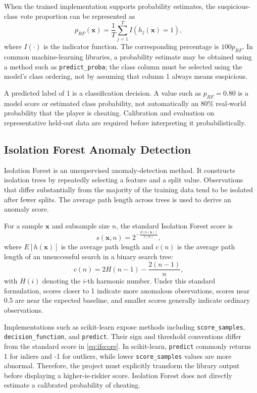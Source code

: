 \documentclass[conference]{IEEEtran}
\begin{document}
When the trained implementation supports probability estimates, the suspicious-class vote proportion can be represented as
\begin{equation}
p_{RF}(\mathbf{x})=\frac{1}{T}\sum_{j=1}^{T} I(h_j(\mathbf{x})=1),
\label{eq:rfprob}
\end{equation}
where $I(\cdot)$ is the indicator function. The corresponding percentage is $100p_{RF}$. In common machine-learning libraries, a probability estimate may be obtained using a method such as \texttt{predict\_proba}; the class column must be selected using the model's class ordering, not by assuming that column 1 always means suspicious.

A predicted label of 1 is a classification decision. A value such as $p_{RF}=0.80$ is a model score or estimated class probability, not automatically an 80\% real-world probability that the player is cheating. Calibration and evaluation on representative held-out data are required before interpreting it probabilistically.

\subsection{Isolation Forest Anomaly Detection}
Isolation Forest is an unsupervised anomaly-detection method. It constructs isolation trees by repeatedly selecting a feature and a split value. Observations that differ substantially from the majority of the training data tend to be isolated after fewer splits. The average path length across trees is used to derive an anomaly score.

For a sample $\mathbf{x}$ and subsample size $n$, the standard Isolation Forest score is
\begin{equation}
s(\mathbf{x},n)=2^{-\frac{E[h(\mathbf{x})]}{c(n)}},
\label{eq:ifscore}
\end{equation}
where $E[h(\mathbf{x})]$ is the average path length and $c(n)$ is the average path length of an unsuccessful search in a binary search tree:
\begin{equation}
c(n)=2H(n-1)-\frac{2(n-1)}{n},
\label{eq:cn}
\end{equation}
with $H(i)$ denoting the $i$-th harmonic number. Under this standard formulation, scores closer to 1 indicate more anomalous observations, scores near 0.5 are near the expected baseline, and smaller scores generally indicate ordinary observations.

Implementations such as scikit-learn expose methods including \texttt{score\_samples}, \texttt{decision\_function}, and \texttt{predict}. Their sign and threshold conventions differ from the standard score in \eqref{eq:ifscore}. In scikit-learn, \texttt{predict} commonly returns 1 for inliers and -1 for outliers, while lower \texttt{score\_samples} values are more abnormal. Therefore, the project must explicitly transform the library output before displaying a higher-is-riskier score. Isolation Forest does not directly estimate a calibrated probability of cheating.
\end{document}

